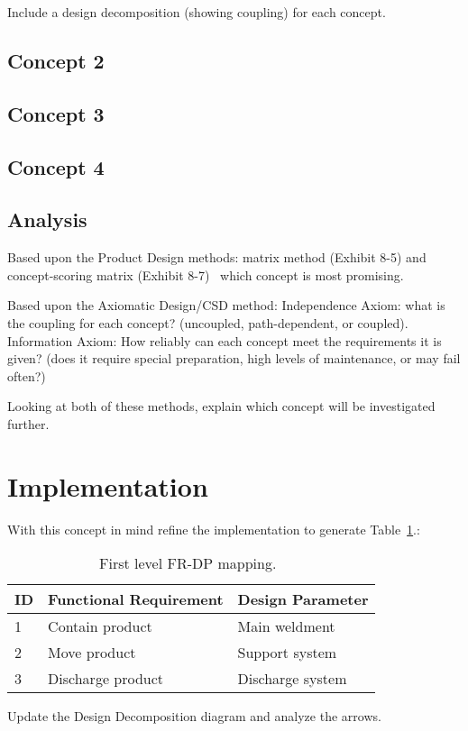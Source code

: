 Include a design decomposition (showing coupling) for each concept.
\subsection{Concept 2}\label{sec:concept-2}

\subsection{Concept 3}\label{sec:concept-3}
\subsection{Concept 4}\label{sec:concept-4}

\subsection{Analysis}
Based upon the Product Design methods:  matrix method (Exhibit 8-5) and concept-scoring matrix (Exhibit 8-7)~\cite{ulrich2020product-design-development} which concept is most promising.

Based upon the Axiomatic Design/CSD method:  Independence Axiom:  what is the coupling for each concept?  (uncoupled, path-dependent, or coupled).  Information Axiom:  How reliably can each concept meet the requirements it is given?  (does it require special preparation, high levels of maintenance, or may fail often?)

Looking at both of these methods, explain which concept will be investigated further.

\section{Implementation}
With this concept in mind refine the implementation to generate Table~\ref{tab:first_level-frdp}.:
\begin{table}
  \center
  \caption{First level FR-DP mapping.~\cite{gerhard2016suretrack}}\label{tab:first_level-frdp}
  \begin{tabular}{lll} \toprule
    ID& Functional Requirement & Design Parameter \\ \midrule 
    1&Contain product&Main weldment\\
    2&Move product&Support system\\
    3&Discharge product &Discharge system\\
    \bottomrule
  \end{tabular}
\end{table}
Update the Design Decomposition diagram and analyze the arrows.

